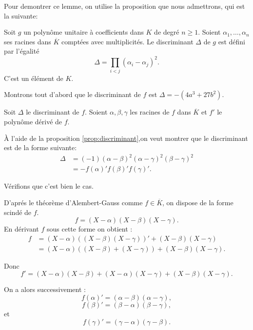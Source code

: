 Pour demontrer ce lemme, on utilise la proposition que nous admettrons, qui est la suivante:
\begin{proposition}
    \label{prop:discriminant}
    Soit $g$ un polynôme unitaire à coefficients dans $K$ de degré $n \ge 1$. Soient
    $\alpha_1,\ldots,\alpha_{n}$ ses racines dans $\overline{K}$ comptées avec
    multiplicités. Le discriminant $\Delta$ de $g$ est défini par l'égalité
    \[
    \Delta = \prod_{i<j}^{} \left( \alpha_{i} - \alpha_{j} \right) ^2 
    .\] 
    C'est un élément de $K$.
\end{proposition}

\begin{demonstration}[Lemme]
    Montrons tout d'abord que le discriminant de $f$ est $\Delta= -(4a^3 + 27b^2)$.

    Soit $\Delta$ le discriminant de $f$. Soient $\alpha, \beta, \gamma $ les racines de $f$ dans $\overline{K}$ et $f'$ le polynôme dérivé de $f$.

    À l'aide de la proposition \ref{prop:discriminant},on veut montrer que le discriminant est de la forme
    suivante: 
    \begin{align*}
        \Delta &= (-1) ( \alpha - \beta )^2 ( \alpha - \gamma )^2 ( \beta - \gamma )^2 \\
          &= - f(\alpha)'f(\beta )'f(\gamma)'
    .\end{align*}

    Vérifions que c'est bien le cas.

    D'aprés le théorème d'Alembert-Gauss comme $f \in \overline{K}$, on dispose de la
    forme scindé de $f$.
    \[
        f = \left( X - \alpha \right) \left( X - \beta \right) \left( X - \gamma \right) 
    .\] 
    En dérivant $f$ sous cette forme on obtient :
    \begin{align*}
        f &= ( X - \alpha ) \left( ( X - \beta ) ( X - \gamma ) \right)'  + ( X - \beta ) ( X - \gamma )\\
          &= ( X - \alpha ) \left( ( X - \beta ) + ( X - \gamma ) \right) + ( X - \beta ) ( X - \gamma ) 
    .\end{align*}

    Donc  
\[
f' = ( X - \alpha ) ( X - \beta ) + ( X - \alpha ) ( X - \gamma ) + ( X - \beta ) ( X - \gamma )
.\] 

On a alors successivement : 
\[
    f(\alpha)' = ( \alpha - \beta) ( \alpha - \gamma )
,\] 
\[
f(\beta )' = ( \beta - \alpha) ( \beta - \gamma)
,\] 
et
\[
f(\gamma)' = ( \gamma - \alpha) ( \gamma - \beta)
.\] 


\end{demonstration}
